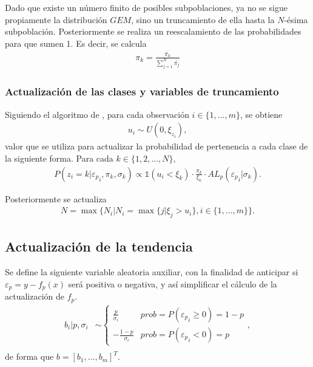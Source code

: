 Dado que existe un n\'umero finito de posibles subpoblaciones, ya no se sigue propiamente la distribuci\'on $GEM$, sino un truncamiento de ella hasta la $N$-\'esima subpoblaci\'on. Posteriormente se realiza un reescalamiento de las probabilidades para que sumen 1. Es decir, se calcula
\begin{equation*}
\begin{aligned}
    \pi_k = \frac{\bar{\pi_k}}{\sum_{j=1}^N \bar{\pi_j}}
\end{aligned}
\end{equation*}

\subsubsection{Actualizaci\'on de las clases y variables de truncamiento}

Siguiendo el algoritmo de \cite{Kalli_Slice}, para cada observaci\'on $i \in \{1,...,m\}$, se obtiene
\begin{equation*}
\begin{aligned}
   u_i \sim U(0, \xi_{z_i}),
\end{aligned}
\end{equation*}
valor que se utiliza para actualizar la probabilidad de pertenencia a cada clase de la siguiente forma. Para cada $k \in \{1,2,...,N\}$,
\begin{equation*}
\begin{aligned}
   P(z_i = k| {\varepsilon_p}_i, \pi_k, \sigma_k)
   \propto
   \mathds{1}(u_i < \xi_k)
   \cdot
   \frac{\pi_k}{\xi_k}
   \cdot
   AL_p({\varepsilon_p}_i | \sigma_k).
\end{aligned}
\end{equation*}

Posteriormente se actualiza
\begin{equation*}
\begin{aligned}
   N = \max\{
    N_i|N_i=\max\{j|\xi_j > u_i\}, 
    i \in \{1,...,m\}
   \}.
\end{aligned}
\end{equation*}

\subsection{Actualizaci\'on de la tendencia}

Se define la siguiente variable aleatoria auxiliar, con la finalidad de anticipar si $\varepsilon_p = y - f_p(x)$ ser\'a positiva o negativa, y as\'i simplificar el c\'alculo de la actualizaci\'on de $f_p$.
\begin{equation*}
\begin{aligned}
    b_i | p, \sigma_i &\sim 
    \begin{cases}
        \frac{p}{\sigma_i} &prob = P({\varepsilon_p}_i \geq 0) = 1-p\\
        -\frac{1-p}{\sigma_i} &prob = P({\varepsilon_p}_i < 0) = p
    \end{cases},\\
\end{aligned}
\end{equation*}
de forma que $b = [b_1,...,b_m]^T$. 

